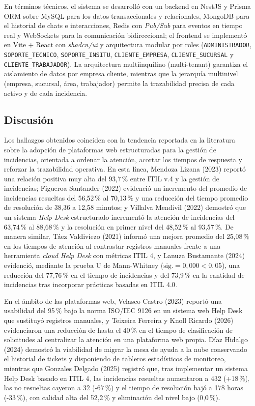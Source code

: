 En términos técnicos, el sistema se desarrolló con un backend en NestJS y Prisma ORM sobre MySQL para los datos transaccionales y relacionales, MongoDB para el historial de chats e interacciones, Redis con \textit{Pub/Sub} para eventos en tiempo real y WebSockets para la comunicación bidireccional; el frontend se implementó en Vite + React con \textit{shadcn/ui} y arquitectura modular por roles (\texttt{ADMINISTRADOR}, \texttt{SOPORTE\_TECNICO}, \texttt{SOPORTE\_INSITU}, \texttt{CLIENTE\_EMPRESA}, \texttt{CLIENTE\_SUCURSAL} y \texttt{CLIENTE\_TRABAJADOR}). La arquitectura multiinquilino (multi-tenant) garantiza el aislamiento de datos por empresa cliente, mientras que la jerarquía multinivel (empresa, sucursal, área, trabajador) permite la trazabilidad precisa de cada activo y de cada incidencia.

\subsection{Discusión}

Los hallazgos obtenidos coinciden con la tendencia reportada en la literatura sobre la adopción de plataformas web estructuradas para la gestión de incidencias, orientada a ordenar la atención, acortar los tiempos de respuesta y reforzar la trazabilidad operativa. En esta línea, Mendoza Lizana (2023) reportó una relación positiva muy alta del 93,7\,\% entre ITIL v.4 y la gestión de incidencias; Figueroa Santander (2022) evidenció un incremento del promedio de incidencias resueltas del 56,52\,\% al 70,13\,\% y una reducción del tiempo promedio de resolución de 38,36 a 12,58 minutos; y Villalva Mendivil (2022) demostró que un sistema \textit{Help Desk} estructurado incrementó la atención de incidencias del 63,74\,\% al 88,68\,\% y la resolución en primer nivel del 48,52\,\% al 93,57\,\%. De manera similar, Táez Valdiviezo (2021) informó una mejora promedio del 25,08\,\% en los tiempos de atención al contrastar registros manuales frente a una herramienta \textit{cloud Help Desk} con métricas ITIL 4, y Lanuza Bustamante (2024) evidenció, mediante la prueba U de Mann-Whitney ($\text{sig.} = 0,000 < 0,05$), una reducción del 77,76\,\% en el tiempo de incidencias y del 73,9\,\% en la cantidad de incidencias tras incorporar prácticas basadas en ITIL 4.0.

En el ámbito de las plataformas web, Velasco Castro (2023) reportó una usabilidad del 95\,\% bajo la norma ISO/IEC 9126 en un sistema web Help Desk que sustituyó registros manuales, y Teixeira Ferreira y Knoll Ricardo (2026) evidenciaron una reducción de hasta el 40\,\% en el tiempo de clasificación de solicitudes al centralizar la atención en una plataforma web propia. Díaz Hidalgo (2024) demostró la viabilidad de migrar la mesa de ayuda a la nube conservando el historial de tickets y disponiendo de tableros estadísticos de monitoreo, mientras que Gonzales Delgado (2025) registró que, tras implementar un sistema Help Desk basado en ITIL 4, las incidencias resueltas aumentaron a 432 (+18\,\%), las no resueltas cayeron a 32 (-67\,\%) y el tiempo de resolución bajó a 178 horas (-33\,\%), con calidad alta del 52,2\,\% y eliminación del nivel bajo (0,0\,\%).

